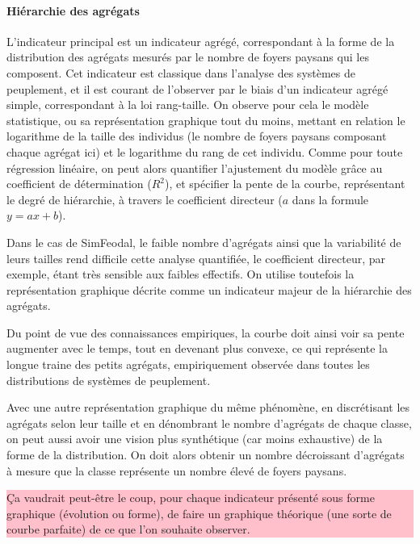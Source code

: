 \paragraph{Hiérarchie des agrégats}

L'indicateur principal est un indicateur agrégé, correspondant à la forme de la distribution des agrégats mesurés par le nombre de foyers paysans qui les composent. Cet indicateur est classique dans l'analyse des systèmes de peuplement, et il est courant de l'observer par le biais d'un indicateur agrégé simple, correspondant à la loi rang-taille. On observe pour cela le modèle statistique, ou sa représentation graphique tout du moins, mettant en relation le logarithme de la taille des individus (le nombre de foyers paysans composant chaque agrégat ici) et le logarithme du rang de cet individu. Comme pour toute régression linéaire, on peut alors quantifier l'ajustement du modèle grâce au coefficient de détermination ($R^2$), et spécifier la pente de la courbe, représentant le degré de hiérarchie, à travers le coefficient directeur ($a$ dans la formule $y = ax + b$).

Dans le cas de SimFeodal, le faible nombre d'agrégats ainsi que la variabilité de leurs tailles rend difficile cette analyse quantifiée, le coefficient directeur, par exemple, étant très sensible aux faibles effectifs. On utilise toutefois la représentation graphique décrite comme un indicateur majeur de la hiérarchie des agrégats.

Du point de vue des connaissances empiriques, la courbe doit ainsi voir sa pente augmenter avec le temps, tout en devenant plus convexe, ce qui représente la \og longue traine\fg{} des petits agrégats, empiriquement observée dans toutes les distributions de systèmes de peuplement.

Avec une autre représentation graphique du même phénomène, en discrétisant les agrégats selon leur taille et en dénombrant le nombre d'agrégats de chaque classe, on peut aussi avoir une vision plus synthétique (car moins exhaustive) de la forme de la distribution. On doit alors obtenir un nombre décroissant d'agrégats à mesure que la classe représente un nombre élevé de foyers paysans.

\colorbox{pink}{\parbox{0.9\textwidth}{%
		\vskip5pt
		Ça vaudrait peut-être le coup, pour chaque indicateur présenté sous forme graphique (évolution ou forme), de faire un graphique théorique (une sorte de courbe parfaite) de ce que l'on souhaite observer.
		\vskip5pt
	}
}

